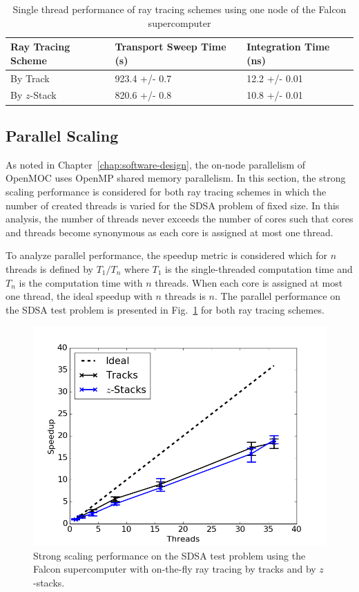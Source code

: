 \begin{table}[ht]
	\centering
	\caption{Single thread performance of ray tracing schemes using one node of the Falcon supercomputer}
	\medskip
	\begin{tabular}{l|l|l}
		\hline
	    Ray Tracing Scheme & Transport Sweep Time (s) & Integration Time (ns) \\
		\hline
		By Track & 923.4 +/- 0.7 & 12.2 +/- 0.01 \\
		By $z$-Stack & 820.6 +/- 0.8 & 10.8 +/- 0.01 \\
		\hline
	\end{tabular}
	\label{tab:rt-single-thread}
\end{table}

\subsection{Parallel Scaling}

As noted in Chapter~\ref{chap:software-design}, the on-node parallelism of OpenMOC uses OpenMP shared memory parallelism. In this section, the strong scaling performance is considered for both ray tracing schemes in which the number of created threads is varied for the SDSA problem of fixed size. In this analysis, the number of threads never exceeds the number of cores such that cores and threads become synonymous as each core is assigned at most one thread. 

To analyze parallel performance, the speedup metric is considered which for $n$ threads is defined by $T_1 / T_n$ where $T_1$ is the single-threaded computation time and $T_n$ is the computation time with $n$ threads. When each core is assigned at most one thread, the ideal speedup with $n$ threads is $n$. The parallel performance on the SDSA test problem is presented in Fig.~\ref{fig:rt-parallel-fs} for both ray tracing schemes.

\begin{figure}[h!]
	\centering
	\includegraphics[width=0.7\linewidth]{figures/results/performance/fs-scaling-comb-stacks-tracks.png}
	\caption[]{Strong scaling performance on the SDSA test problem using the Falcon supercomputer with on-the-fly ray tracing by tracks and by $z$-stacks.}
	\label{fig:rt-parallel-fs}
\end{figure}

